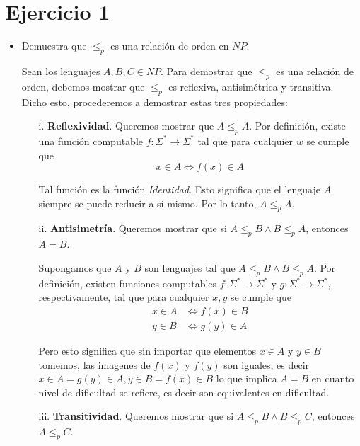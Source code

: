 \documentclass[12pt,letterpaper]{article}
\begin{document}
\section*{Ejercicio 1}
\begin{itemize}
    \item Demuestra que $\leq_p$ es una relación de orden en $NP$.
    
    Sean los lenguajes $A, B, C \in NP$. Para demostrar que $\leq_p$ es una relación de orden, 
    debemos mostrar que $\leq_p$ es reflexiva, antisimétrica y transitiva. 
    Dicho esto, procederemos a demostrar estas tres propiedades:
    \begin{itemize}
        \item[i.] \textbf{Reflexividad}. Queremos mostrar que $A \leq_p A$. 
        Por definición, existe una función computable $f: \Sigma^* \rightarrow 
        \Sigma^*$ tal que para cualquier $w$ se cumple que 
        \begin{equation*}
            x \in A \Leftrightarrow f(x) \in A
        \end{equation*}

        Tal función es la función \textit{Identidad}. Esto significa que el lenguaje $A$ siempre se puede reducir a sí mismo. 
        Por lo tanto, $A \leq_p A$. 

        \item[ii.] \textbf{Antisimetría}. Queremos mostrar que si $A \leq_p B 
        \land B \leq_p A$, entonces $A = B$.

        Supongamos que $A$ y $B$ son lenguajes tal que $A \leq_p B 
        \land B \leq_p A$. Por definición, existen funciones computables 
        $f: \Sigma^* \rightarrow \Sigma^*$ y $g: \Sigma^* \rightarrow \Sigma^*$, 
        respectivamente, tal que para cualquier $x,y$ se cumple que 
        \begin{align*}
            x \in A &\Leftrightarrow f(x) \in B \\ 
            y \in B &\Leftrightarrow g(y) \in A
        \end{align*} 

        Pero esto significa que sin importar que elementos $x \in A$ y $y \in B$ 
        tomemos, las imagenes de $f(x)$ y $f(y)$ son iguales, es decir $x \in A = g(y) \in A, y \in B = f(x) \in B$ lo que implica $A = B$ en cuanto nivel de dificultad se refiere, es decir son equivalentes en dificultad.

        \item[iii.] \textbf{Transitividad}. Queremos mostrar que si $A \leq_p 
        B \land B \leq_p C$, entonces $A \leq_p C$. 


\end{itemize}
\end{itemize}
\end{document}

